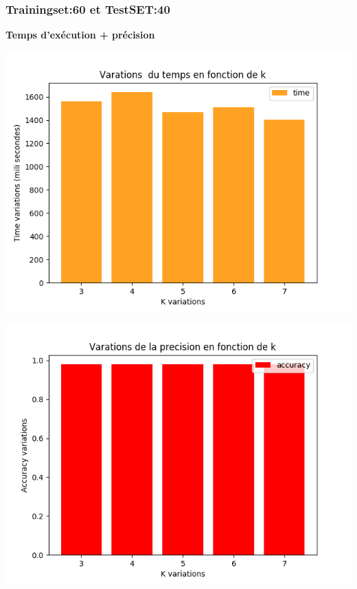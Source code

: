 \documentclass[12pt,a4paper,oneside]{book}
\begin{document}
	
	\subsubsection{Trainingset:60 et TestSET:40}
	\textbf{Temps d'exécution + précision}\\
	\begin{frame}{}
		\centering
		\begin{minipage}[b]{0.5\linewidth}
			\includegraphics[scale=0.5]{image/data2:Train,60,Test,40time.png}
			\label{labelname}%
		\end{minipage}
		\hspace{0.5cm}
		\begin{minipage}[b]{0.5\linewidth}
			\includegraphics[scale=0.5]{image/data2:Train,60,Test,40:accuracy.png}%
			\label{labelname}%
		\end{minipage}
	\end{frame}
	
\end{document}
